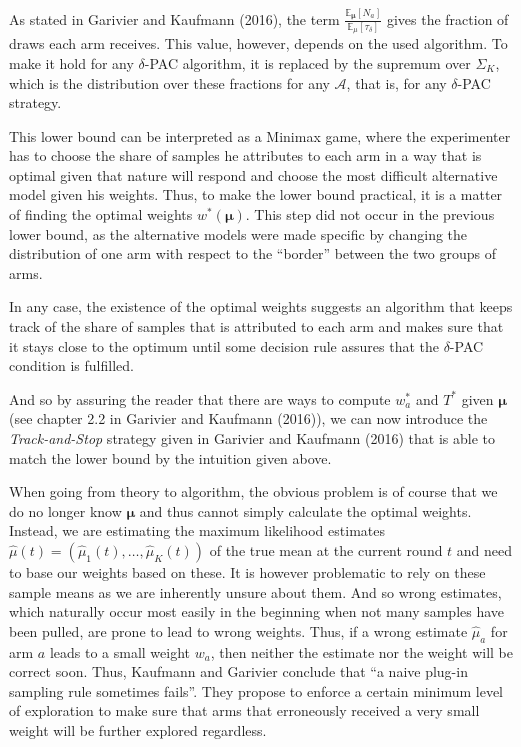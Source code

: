 \documentclass[12pt,]{article}
\begin{document}
As stated in Garivier and Kaufmann (2016), the term
\(\frac{\mathbb{E}_{\bm{\mu}}[N_a]}{\mathbb{E}_{\mu}[\tau_{\delta}]}\)
gives the fraction of draws each arm receives. This value, however,
depends on the used algorithm. To make it hold for any \(\delta\)-PAC
algorithm, it is replaced by the supremum over \(\Sigma_K\), which is
the distribution over these fractions for any \(\mathcal{A}\), that is,
for any \(\delta\)-PAC strategy.

This lower bound can be interpreted as a Minimax game, where the
experimenter has to choose the share of samples he attributes to each
arm in a way that is optimal given that nature will respond and choose
the most difficult alternative model given his weights. Thus, to make
the lower bound practical, it is a matter of finding the optimal weights
\(w^*(\bm{\mu})\). This step did not occur in the previous lower bound,
as the alternative models were made specific by changing the
distribution of one arm with respect to the ``border'' between the two
groups of arms.

In any case, the existence of the optimal weights suggests an algorithm
that keeps track of the share of samples that is attributed to each arm
and makes sure that it stays close to the optimum until some decision
rule assures that the \(\delta\)-PAC condition is fulfilled.

And so by assuring the reader that there are ways to compute \(w_a^*\)
and \(T^*\) given \(\bm{\mu}\) (see chapter 2.2 in Garivier and Kaufmann
(2016)), we can now introduce the \emph{Track-and-Stop} strategy given
in Garivier and Kaufmann (2016) that is able to match the lower bound by
the intuition given above.

When going from theory to algorithm, the obvious problem is of course
that we do no longer know \(\bm{\mu}\) and thus cannot simply calculate
the optimal weights. Instead, we are estimating the maximum likelihood
estimates \(\hat{\mu}(t) = (\hat{\mu}_1(t), \dots, \hat{\mu}_K(t))\) of
the true mean at the current round \(t\) and need to base our weights
based on these. It is however problematic to rely on these sample means
as we are inherently unsure about them. And so wrong estimates, which
naturally occur most easily in the beginning when not many samples have
been pulled, are prone to lead to wrong weights. Thus, if a wrong
estimate \(\hat{\mu}_a\) for arm \(a\) leads to a small weight \(w_a\),
then neither the estimate nor the weight will be correct soon. Thus,
Kaufmann and Garivier conclude that ``a naive plug-in sampling rule
sometimes fails''. They propose to enforce a certain minimum level of
exploration to make sure that arms that erroneously received a very
small weight will be further explored regardless.
\end{document}
